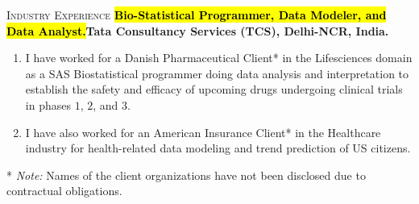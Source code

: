 \begin{rubric}{\textsc{Industry Experience}}
\entry*[$2011 - 2019$]%
\textbf{\hl{Bio-Statistical Programmer, Data Modeler, and Data Analyst.}\newline Tata Consultancy Services (TCS), Delhi-NCR, India.}
\begin{enumerate}
    \item[\circled{1}] I have worked for a Danish Pharmaceutical Client* in the Lifesciences domain as a SAS Biostatistical programmer doing data analysis and interpretation to establish the safety and efficacy of upcoming drugs undergoing clinical trials in phases $1$, $2$, and $3$.
    \item[\circled{2}] I have also worked for an American Insurance Client* in the Healthcare industry for health-related data modeling and trend prediction of US citizens.
\end{enumerate}
* \emph{Note:} Names of the client organizations have not been disclosed due to contractual obligations.
%
%
%
\end{rubric}